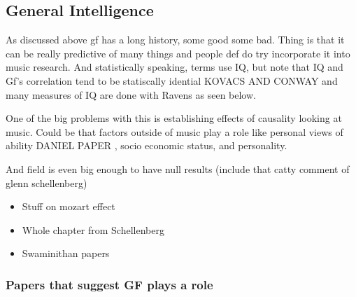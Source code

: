 \documentclass[]{book}
\providecommand{\tightlist}{%
  \setlength{\itemsep}{0pt}\setlength{\parskip}{0pt}}
\theoremstyle{definition}
\theoremstyle{definition}
\theoremstyle{definition}
\theoremstyle{remark}
\begin{document}
\hypertarget{general-intelligence}{%
\subsection{General Intelligence}\label{general-intelligence}}

As discussed above gf has a long history, some good some bad. Thing is
that it can be really predictive of many things and people def do try
incorporate it into music research. And statistically speaking, terms
use IQ, but note that IQ and Gf's correlation tend to be statiscally
idential KOVACS AND CONWAY and many measures of IQ are done with Ravens
as seen below.

One of the big problems with this is establishing effects of causality
looking at music. Could be that factors outside of music play a role
like personal views of ability DANIEL PAPER , socio economic status, and
personality.

And field is even big enough to have null results (include that catty
comment of glenn schellenberg)

\begin{itemize}
\tightlist
\item
  Stuff on mozart effect
\item
  Whole chapter from Schellenberg
\item
  Swaminithan papers
\end{itemize}

\hypertarget{papers-that-suggest-gf-plays-a-role}{%
\subsubsection{Papers that suggest GF plays a
role}\label{papers-that-suggest-gf-plays-a-role}}
\end{document}
